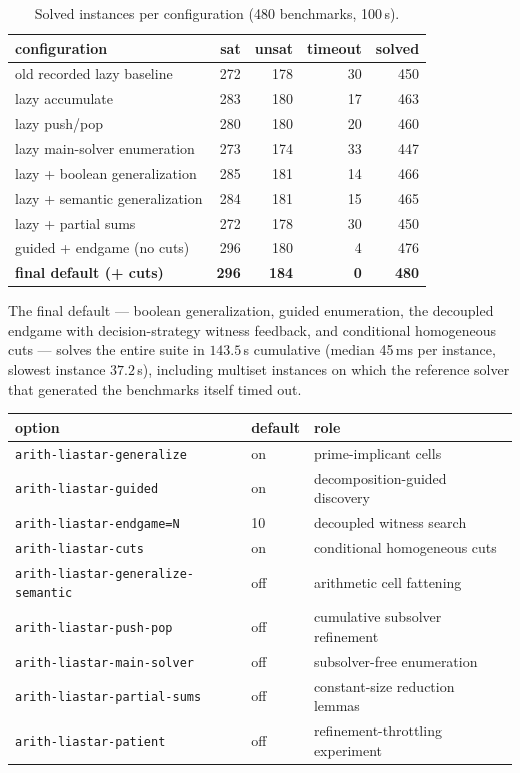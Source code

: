 \documentclass[11pt]{article}
\begin{document}
\begin{table}[h]
\centering
\caption{Solved instances per configuration (480 benchmarks, 100\,s).}
\begin{tabular}{lrrrr}
\toprule
configuration & sat & unsat & timeout & solved \\
\midrule
old recorded lazy baseline          & 272 & 178 & 30 & 450 \\
lazy accumulate                     & 283 & 180 & 17 & 463 \\
lazy push/pop                       & 280 & 180 & 20 & 460 \\
lazy main-solver enumeration        & 273 & 174 & 33 & 447 \\
lazy + boolean generalization       & 285 & 181 & 14 & 466 \\
lazy + semantic generalization      & 284 & 181 & 15 & 465 \\
lazy + partial sums                 & 272 & 178 & 30 & 450 \\
guided + endgame (no cuts)          & 296 & 180 &  4 & 476 \\
\textbf{final default (+ cuts)}     & \textbf{296} & \textbf{184} & \textbf{0} & \textbf{480} \\
\bottomrule
\end{tabular}
\end{table}

The final default --- boolean generalization, guided enumeration, the
decoupled endgame with decision-strategy witness feedback, and conditional
homogeneous cuts --- solves the entire suite in $143.5$\,s cumulative
(median 45\,ms per instance, slowest instance $37.2$\,s), including
multiset instances on which the reference solver that generated the
benchmarks itself timed out.

\begin{center}
\begin{tabular}{lll}
\toprule
option & default & role \\
\midrule
\texttt{arith-liastar-generalize} & on & prime-implicant cells \\
\texttt{arith-liastar-guided} & on & decomposition-guided discovery \\
\texttt{arith-liastar-endgame=N} & 10 & decoupled witness search \\
\texttt{arith-liastar-cuts} & on & conditional homogeneous cuts \\
\texttt{arith-liastar-generalize-semantic} & off & arithmetic cell fattening \\
\texttt{arith-liastar-push-pop} & off & cumulative subsolver refinement \\
\texttt{arith-liastar-main-solver} & off & subsolver-free enumeration \\
\texttt{arith-liastar-partial-sums} & off & constant-size reduction lemmas \\
\texttt{arith-liastar-patient} & off & refinement-throttling experiment \\
\bottomrule
\end{tabular}
\end{center}
\end{document}
